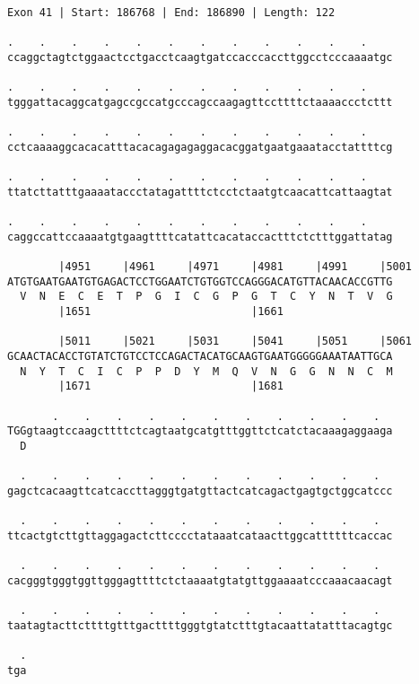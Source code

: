 \documentclass{article}
\begin{document}
\begin{Verbatim}[fontfamily=courier]
Exon 41 | Start: 186768 | End: 186890 | Length: 122

.    .    .    .    .    .    .    .    .    .    .    .    
ccaggctagtctggaactcctgacctcaagtgatccacccaccttggcctcccaaaatgc

.    .    .    .    .    .    .    .    .    .    .    .    
tgggattacaggcatgagccgccatgcccagccaagagttccttttctaaaaccctcttt

.    .    .    .    .    .    .    .    .    .    .    .    
cctcaaaaggcacacatttacacagagagaggacacggatgaatgaaatacctattttcg

.    .    .    .    .    .    .    .    .    .    .    .    
ttatcttatttgaaaataccctatagattttctcctctaatgtcaacattcattaagtat

.    .    .    .    .    .    .    .    .    .    .    .    
caggccattccaaaatgtgaagttttcatattcacataccactttctctttggattatag

        |4951     |4961     |4971     |4981     |4991     |5001
ATGTGAATGAATGTGAGACTCCTGGAATCTGTGGTCCAGGGACATGTTACAACACCGTTG
  V  N  E  C  E  T  P  G  I  C  G  P  G  T  C  Y  N  T  V  G
        |1651                         |1661                 

        |5011     |5021     |5031     |5041     |5051     |5061
GCAACTACACCTGTATCTGTCCTCCAGACTACATGCAAGTGAATGGGGGAAATAATTGCA
  N  Y  T  C  I  C  P  P  D  Y  M  Q  V  N  G  G  N  N  C  M
        |1671                         |1681                 

       .    .    .    .    .    .    .    .    .    .    .  
TGGgtaagtccaagcttttctcagtaatgcatgtttggttctcatctacaaagaggaaga
  D                                                         

  .    .    .    .    .    .    .    .    .    .    .    .  
gagctcacaagttcatcaccttagggtgatgttactcatcagactgagtgctggcatccc

  .    .    .    .    .    .    .    .    .    .    .    .  
ttcactgtcttgttaggagactcttcccctataaatcataacttggcattttttcaccac

  .    .    .    .    .    .    .    .    .    .    .    .  
cacgggtgggtggttgggagttttctctaaaatgtatgttggaaaatcccaaacaacagt

  .    .    .    .    .    .    .    .    .    .    .    .  
taatagtacttcttttgtttgacttttgggtgtatctttgtacaattatatttacagtgc

  .
tga
\end{Verbatim}
\newpage
\end{document}
